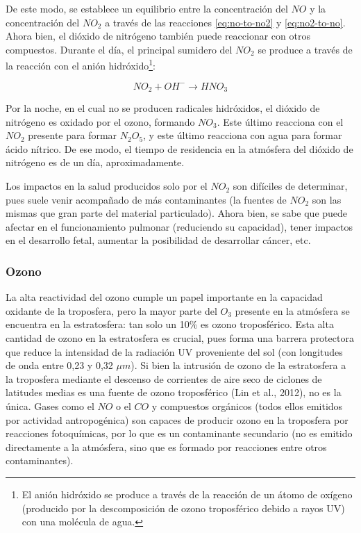 \documentclass[12pt]{article}
\begin{document}
De este modo, se establece un equilibrio entre la concentración del $NO$ y la concentración del $NO_{2}$ a través de las reacciones \ref{eq:no-to-no2} y \ref{eq:no2-to-no}. Ahora bien, el dióxido de nitrógeno también puede reaccionar con otros compuestos. Durante el día, el principal sumidero del $NO_{2}$ se produce a través de la reacción con el anión hidróxido\footnote{El anión hidróxido se produce a través de la reacción de un átomo de oxígeno (producido por la descomposición de ozono troposférico debido a rayos UV) con una molécula de agua.}:

\begin{equation}
NO_{2} + OH^{-} \rightarrow HNO_{3}
\label{eq:no2-to-hno3}
\end{equation}

Por la noche, en el cual no se producen radicales hidróxidos, el dióxido de nitrógeno es oxidado por el ozono, formando $NO_{3}$. Este último reacciona con el $NO_{2}$ presente para formar $N_{2}O_{5}$, y este último reacciona con agua para formar ácido nítrico. De ese modo, el tiempo de residencia en la atmósfera del dióxido de nitrógeno es de un día, aproximadamente.

Los impactos en la salud producidos solo por el $NO_{2}$ son difíciles de determinar, pues suele venir acompañado de más contaminantes (la fuentes de $NO_{2}$ son las mismas que gran parte del material particulado). Ahora bien, se sabe que puede afectar en el funcionamiento pulmonar (reduciendo su capacidad), tener impactos en el desarrollo fetal, aumentar la posibilidad de desarrollar cáncer, etc.

\subsubsection{Ozono}

La alta reactividad del ozono cumple un papel importante en la capacidad oxidante de la troposfera, pero la mayor parte del $O_{3}$ presente en la atmósfera se encuentra en la estratosfera: tan solo un 10\% es ozono troposférico. Esta alta cantidad de ozono en la estratosfera es crucial, pues forma una barrera protectora que reduce la intensidad de la radiación UV proveniente del sol (con longitudes de onda entre 0,23 y 0,32 $\mu m$). Si bien la intrusión de ozono de la estratosfera a la troposfera mediante el descenso de corrientes de aire seco de ciclones de latitudes medias es una fuente de ozono troposférico (Lin et al., 2012), no es la única. Gases como el $NO$ o el $CO$ y compuestos orgánicos (todos ellos emitidos por actividad antropogénica) son capaces de producir ozono en la troposfera por reacciones fotoquímicas, por lo que es un contaminante secundario (no es emitido directamente a la atmósfera, sino que es formado por reacciones entre otros contaminantes).
\end{document}
